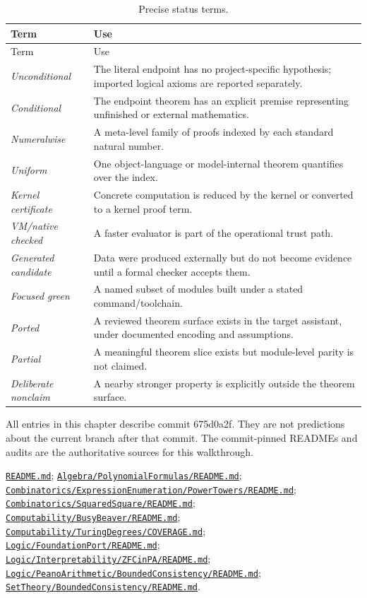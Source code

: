 \documentclass[
  10pt,
  a4paper,
  twoside,
  open=any,
  parskip=half,
  headings=big
]{scrreprt}
\newcommand{\CommitFull}{675d0a2ff0fc624fba199e006049016ba806f40a}
\newcommand{\CommitShort}{675d0a2f}
\newcommand{\RepoBlobBase}{https://github.com/VladimirReshetnikov/ProveIt/blob/\CommitFull/}
\newcommand{\RepoFile}[1]{%
  \href{\RepoBlobBase\detokenize{#1}}{\nolinkurl{#1}}}
\begin{document}
\begin{longtable}{L{.23\textwidth}L{.66\textwidth}}
\caption{Precise status terms.}
\label{tab:status-vocabulary}\\
\toprule
Term & Use \\
\midrule
\endfirsthead
\toprule
Term & Use \\
\midrule
\endhead
\emph{Unconditional} &
The literal endpoint has no project-specific hypothesis; imported logical
axioms are reported separately.\\
\emph{Conditional} &
The endpoint theorem has an explicit premise representing unfinished or
external mathematics.\\
\emph{Numeralwise} &
A meta-level family of proofs indexed by each standard natural number.\\
\emph{Uniform} &
One object-language or model-internal theorem quantifies over the index.\\
\emph{Kernel certificate} &
Concrete computation is reduced by the kernel or converted to a kernel proof
term.\\
\emph{VM/native checked} &
A faster evaluator is part of the operational trust path.\\
\emph{Generated candidate} &
Data were produced externally but do not become evidence until a formal
checker accepts them.\\
\emph{Focused green} &
A named subset of modules built under a stated command/toolchain.\\
\emph{Ported} &
A reviewed theorem surface exists in the target assistant, under documented
encoding and assumptions.\\
\emph{Partial} &
A meaningful theorem slice exists but module-level parity is not claimed.\\
\emph{Deliberate nonclaim} &
A nearby stronger property is explicitly outside the theorem surface.\\
\bottomrule
\end{longtable}

\begin{statusbox}
All entries in this chapter describe commit \CommitShort.  They are not
predictions about the current branch after that commit.  The commit-pinned
READMEs and audits are the authoritative sources for this walkthrough.
\end{statusbox}

\begin{sourcebox}
\RepoFile{README.md};
\RepoFile{Algebra/PolynomialFormulas/README.md};
\RepoFile{Combinatorics/ExpressionEnumeration/PowerTowers/README.md};
\RepoFile{Combinatorics/SquaredSquare/README.md};
\RepoFile{Computability/BusyBeaver/README.md};
\RepoFile{Computability/TuringDegrees/COVERAGE.md};
\RepoFile{Logic/FoundationPort/README.md};
\RepoFile{Logic/Interpretability/ZFCinPA/README.md};
\RepoFile{Logic/PeanoArithmetic/BoundedConsistency/README.md};
\RepoFile{SetTheory/BoundedConsistency/README.md}.
\end{sourcebox}
\end{document}
